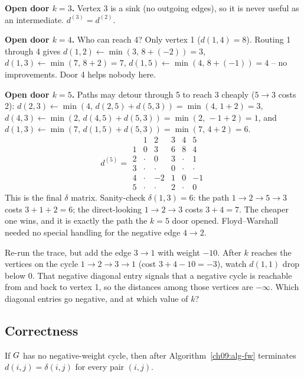 \textbf{Open door $k=3$.} Vertex 3 is a sink (no outgoing edges), so it is never useful as an
intermediate. $d^{(3)}=d^{(2)}$.

\textbf{Open door $k=4$.} Who can reach 4? Only vertex 1 ($d(1,4)=8$). Routing 1 through 4 gives
$d(1,2)\leftarrow\min(3,\,8+(-2))=3$, $d(1,3)\leftarrow\min(7,\,8+2)=7$,
$d(1,5)\leftarrow\min(4,\,8+(-1))=4$ -- no improvements. Door 4 helps nobody here.

\textbf{Open door $k=5$.} Paths may detour through 5 to reach 3 cheaply ($5\to3$ costs 2):
$d(2,3)\leftarrow\min(4,\,d(2,5)+d(5,3))=\min(4,\,1+2)=3$,
$d(4,3)\leftarrow\min(2,\,d(4,5)+d(5,3))=\min(2,\,-1+2)=1$, and
$d(1,3)\leftarrow\min(7,\,d(1,5)+d(5,3))=\min(7,\,4+2)=6$.
\[
d^{(5)}=
\begin{array}{c|ccccc}
 & 1 & 2 & 3 & 4 & 5\\\hline
1 & 0 & 3 & 6 & 8 & 4\\
2 & \cdot & 0 & 3 & \cdot & 1\\
3 & \cdot & \cdot & 0 & \cdot & \cdot\\
4 & \cdot & -2 & 1 & 0 & -1\\
5 & \cdot & \cdot & 2 & \cdot & 0
\end{array}
\]
This is the final $\delta$ matrix. Sanity-check $\delta(1,3)=6$: the path $1\to2\to5\to3$ costs
$3+1+2=6$; the direct-looking $1\to2\to3$ costs $3+4=7$. The cheaper one wins, and it is exactly the
path the $k=5$ door opened. Floyd--Warshall needed no special handling for the negative edge
$4\to2$.

\begin{labbox}
Re-run the trace, but add the edge $3\to1$ with weight $-10$. After $k$ reaches the vertices on the
cycle $1\to2\to3\to1$ (cost $3+4-10=-3$), watch $d(1,1)$ drop below $0$. That negative diagonal entry
signals that a negative cycle is reachable from and back to vertex 1, so the
distances among those vertices are $-\infty$. Which diagonal entries go negative, and at which value
of $k$?
\end{labbox}

\subsection{Correctness}

\begin{theorem}
\label{ch09:thm-fw}
If $G$ has no negative-weight cycle, then after Algorithm~\ref{ch09:alg-fw} terminates
$d(i,j)=\delta(i,j)$ for every pair $(i,j)$.
\end{theorem}

